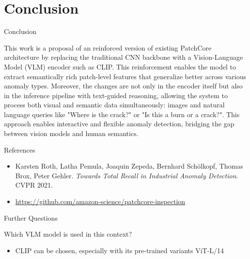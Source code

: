 \section{Conclusion}
\begin{frame}{Conclusion}
\begin{block}{}
This work is a proposal of an reinforced version of existing PatchCore architecture by replacing the traditional CNN backbone with a Vision-Language Model (VLM) encoder such as CLIP. This reinforcement enables the model to extract semantically rich patch-level features that generalize better across various anomaly types. Moreover, the changes are not only in the encoder itself but also in the inference pipeline with text-guided reasoning, allowing the system to process both visual and semantic data simultaneously: images and natural language queries like "Where is the crack?" or "Is this a burn or a crack?". This approach enables interactive and flexible anomaly detection, bridging the gap between vision models and human semantics.
\end{block}
\end{frame}

\begin{frame}{References}
    \begin{itemize}
        \item Karsten Roth, Latha Pemula, Joaquin Zepeda, Bernhard Schölkopf, Thomas Brox, Peter Gehler. \textit{Towards Total Recall in Industrial Anomaly Detection}. CVPR 2021. 
        \item \url{https://github.com/amazon-science/patchcore-inspection}
    \end{itemize}
\end{frame}

\begin{frame}{Further Questions}
    \begin{block}{Which VLM model is used in this context?}
    \begin{itemize}
        \item CLIP can be chosen, especially with its pre-trained variants ViT-L/14
    \end{itemize}
    \end{block}
\end{frame}

